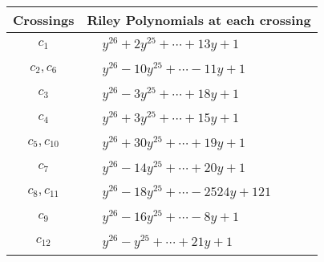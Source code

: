 \documentclass[1p]{elsarticle_modified}
\theoremstyle{definition}
\begin{document}
\begin{tabular}{m{50pt}|m{274pt}}
Crossings & \hspace{64pt}Riley Polynomials at each crossing \\
\hline $$\begin{aligned}c_{1}\end{aligned}$$&$\begin{aligned}
&y^{26}+2 y^{25}+\cdots+13 y+1
\end{aligned}$\\
\hline $$\begin{aligned}c_{2},c_{6}\end{aligned}$$&$\begin{aligned}
&y^{26}-10 y^{25}+\cdots-11 y+1
\end{aligned}$\\
\hline $$\begin{aligned}c_{3}\end{aligned}$$&$\begin{aligned}
&y^{26}-3 y^{25}+\cdots+18 y+1
\end{aligned}$\\
\hline $$\begin{aligned}c_{4}\end{aligned}$$&$\begin{aligned}
&y^{26}+3 y^{25}+\cdots+15 y+1
\end{aligned}$\\
\hline $$\begin{aligned}c_{5},c_{10}\end{aligned}$$&$\begin{aligned}
&y^{26}+30 y^{25}+\cdots+19 y+1
\end{aligned}$\\
\hline $$\begin{aligned}c_{7}\end{aligned}$$&$\begin{aligned}
&y^{26}-14 y^{25}+\cdots+20 y+1
\end{aligned}$\\
\hline $$\begin{aligned}c_{8},c_{11}\end{aligned}$$&$\begin{aligned}
&y^{26}-18 y^{25}+\cdots-2524 y+121
\end{aligned}$\\
\hline $$\begin{aligned}c_{9}\end{aligned}$$&$\begin{aligned}
&y^{26}-16 y^{25}+\cdots-8 y+1
\end{aligned}$\\
\hline $$\begin{aligned}c_{12}\end{aligned}$$&$\begin{aligned}
&y^{26}- y^{25}+\cdots+21 y+1
\end{aligned}$\\
\hline
\end{tabular}\\~\\
\end{document}
